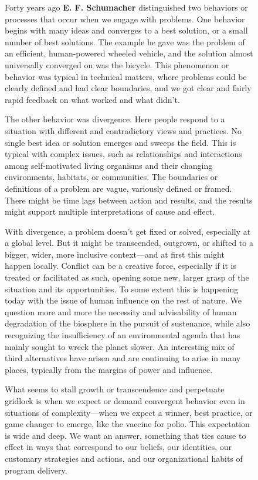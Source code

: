 \documentclass[11pt,letterpaper,twoside,onecolumn]{memoir}
\begin{document}
\begin{figure}
\begin{tcolorbox}
\setlength{\parskip}{.7em}

Forty years ago \textbf{E. F. Schumacher} distinguished two behaviors or processes that occur when we engage with problems. One behavior begins with many ideas and converges to a best solution, or a small number of best solutions. The example he gave was the problem of an efficient, human-powered wheeled vehicle, and the solution almost universally converged on was the bicycle. This phenomenon or behavior was typical in technical matters, where problems could be clearly defined and had clear boundaries, and we got clear and fairly rapid feedback on what worked and what didn't.

The other behavior was divergence. Here people respond to a situation with different and contradictory views and practices. No single best idea or solution emerges and sweeps the field. This is typical with complex issues, such as relationships and interactions among self-motivated living organisms and their changing environments, habitats, or communities. The boundaries or definitions of a problem are vague, variously defined or framed. There might be time lags between action and results, and the results might support multiple interpretations of cause and effect.

With divergence, a problem doesn't get fixed or solved, especially at a global level. But it might be transcended, outgrown, or shifted to a bigger, wider, more inclusive context---and at first this might happen locally. Conflict can be a creative force, especially if it is treated or facilitated as such, opening some new, larger grasp of the situation and its opportunities. To some extent this is happening today with the issue of human influence on the rest of nature. We question more and more the necessity and advisability of human degradation of the biosphere in the pursuit of sustenance, while also recognizing the insufficiency of an environmental agenda that has mainly sought to wreck the planet slower. An interesting mix of third alternatives have arisen and are continuing to arise in many places, typically from the margins of power and influence.

What seems to stall growth or transcendence and perpetuate gridlock is when we expect or demand convergent behavior even in situations of complexity---when we expect a winner, best practice, or game changer to emerge, like the vaccine for polio. This expectation is wide and deep. We want an answer, something that ties cause to effect in ways that correspond to our beliefs, our identities, our customary strategies and actions, and our organizational habits of program delivery.


\end{tcolorbox}
\end{figure}
\end{document}
